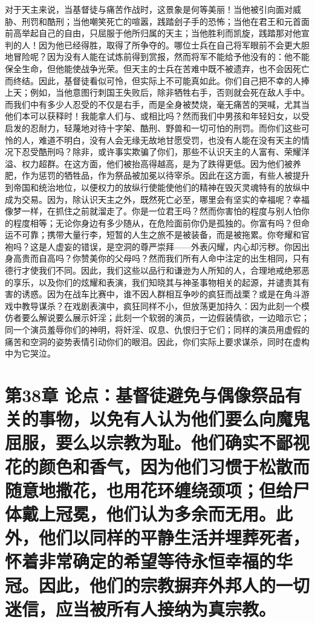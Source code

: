 对于天主来说，当基督徒与痛苦作战时，这景象是何等美丽！当他被引向面对威胁、刑罚和酷刑；当他嘲笑死亡的喧嚣，践踏刽子手的恐怖；当他在君王和元首面前高举起自己的自由，只屈服于他所归属的天主；当他胜利而凯旋，践踏那对他宣判的人！因为他已经得胜，取得了所争夺的。哪位士兵在自己将军眼前不会更大胆地冒险呢？因为没有人能在试炼前得到赏报，然而将军不能给予他没有的：他不能保全生命，但他能使战争光荣。但天主的士兵在苦难中既不被遗弃，也不会因死亡而终结。因此，基督徒看似可怜，但实际上不可能真如此。你们自己把不幸的人捧上天；例如，当他意图行刺国王失败后，除非牺牲右手，否则就会死在敌人手中。而我们中有多少人忍受的不仅是右手，而是全身被焚烧，毫无痛苦的哭喊，尤其当他们本可以获释时！我能拿人们与、或相比吗？然而我们中男孩和年轻妇女，以受启发的忍耐力，轻蔑地对待十字架、酷刑、野兽和一切可怕的刑罚。而你们这些可怜的人，难道不明白，没有人会无缘无故地甘愿受罚，也没有人能在没有天主的情况下忍受酷刑吗？除非，或许事实欺骗了你们，那些不认识天主的人富有、荣耀洋溢、权力超群。在这方面，他们被抬高得越高，是为了跌得更低。因为他们被养肥，作为惩罚的牺牲品，作为祭品被加冕以待宰杀。因此在这方面，有些人被提升到帝国和统治地位，以便权力的放纵行使能使他们的精神在毁灭灵魂特有的放纵中成为交易。因为，除认识天主之外，既然死亡必至，哪里会有坚实的幸福呢？幸福像梦一样，在抓住之前就溜走了。你是一位君王吗？然而你害怕的程度与别人怕你的程度相等；无论你身边有多少随从，在危险面前你仍是孤独的。你富有吗？但命运不可靠；携带大量行李，短暂的人生之旅不是被装备，而是被拖累。你夸耀和官袍吗？这是人虚妄的错误，是空洞的尊严崇拜——外表闪耀，内心却污秽。你因出身高贵而自高吗？你赞美你的父母吗？然而我们所有人命中注定的出生相同，只有德行才使我们不同。因此，我们这些以品行和谦逊为人所知的人，合理地戒绝邪恶的享乐，以及你们的炫耀和表演，我们知晓其与神圣事物相关的起源，并谴责其有害的诱惑。因为在战车比赛中，谁不因人群相互争吵的疯狂而战栗？或是在角斗游戏中教导谋杀？在戏剧表演中，疯狂同样不小，但放荡更加持久：因为此刻一个模仿者要么解说要么展示奸淫；此刻一个软弱的演员，一边假装情欲，一边暗示它；同一个演员羞辱你们的神明，将奸淫、叹息、仇恨归于它们；同样的演员用虚假的痛苦和空洞的姿势表情引动你们的眼泪。因此，你们实际上要求谋杀，同时在虚构中为它哭泣。\par


\section{第38章 论点：基督徒避免与偶像祭品有关的事物，以免有人认为他们要么向魔鬼屈服，要么以宗教为耻。他们确实不鄙视花的颜色和香气，因为他们习惯于松散而随意地撒花，也用花环缠绕颈项；但给尸体戴上冠冕，他们认为多余而无用。此外，他们以同样的平静生活并埋葬死者，怀着非常确定的希望等待永恒幸福的华冠。因此，他们的宗教摒弃外邦人的一切迷信，应当被所有人接纳为真宗教。}

